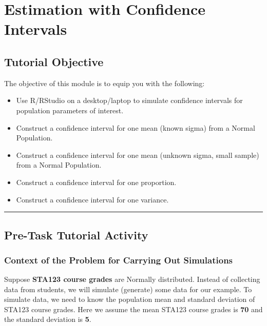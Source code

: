 \documentclass[oneside,openany]{book}
\begin{document}
\chapter{Estimation with Confidence Intervals}\label{activity-5---estimation-with-confidence-intervals}

\section{Tutorial Objective}\label{tutorial-objective-2}

The objective of this module is to equip you with the following:
\begin{itemize}
    \item Use R/RStudio on a desktop/laptop to simulate confidence intervals for population parameters of interest.
    \item Construct a confidence interval for one mean (known sigma) from a Normal Population.
    \item Construct a confidence interval for one mean (unknown sigma, small sample) from a Normal Population.
    \item Construct a confidence interval for one proportion.
    \item Construct a confidence interval for one variance.
\end{itemize}


\begin{center}\rule{0.5\linewidth}{0.5pt}\end{center}

\section{Pre-Task Tutorial Activity}\label{pre-task-tutorial-activity-1}

\subsection{Context of the Problem for Carrying Out Simulations}\label{context-of-the-problem-for-carrying-out-simulations}

Suppose \textbf{STA123 course grades} are Normally distributed. Instead of collecting data from students, we will simulate (generate) some data for our example. To simulate data, we need to know the population mean and standard deviation of STA123 course grades. Here we assume the mean STA123 course grades is \textbf{70} and the standard deviation is \textbf{5}.
\end{document}
